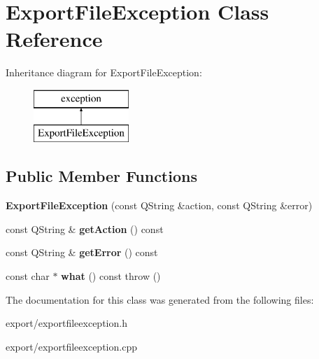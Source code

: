\hypertarget{class_export_file_exception}{\section{Export\-File\-Exception Class Reference}
\label{class_export_file_exception}
}
Inheritance diagram for Export\-File\-Exception\-:\begin{figure}[H]
\begin{center}
\leavevmode
\includegraphics[height=2.000000cm]{class_export_file_exception}
\end{center}
\end{figure}
\subsection*{Public Member Functions}
\begin{DoxyCompactItemize}
\item 
\hypertarget{class_export_file_exception_a700c35c0496ed76883214320fd458d5d}{{\bfseries Export\-File\-Exception} (const Q\-String \&action, const Q\-String \&error)}\label{class_export_file_exception_a700c35c0496ed76883214320fd458d5d}

\item 
\hypertarget{class_export_file_exception_ae1d1a3f3c59d1ceeebb52f6b21319908}{const Q\-String \& {\bfseries get\-Action} () const }\label{class_export_file_exception_ae1d1a3f3c59d1ceeebb52f6b21319908}

\item 
\hypertarget{class_export_file_exception_a538ee96bcc238fcdbbff041c4342fd18}{const Q\-String \& {\bfseries get\-Error} () const }\label{class_export_file_exception_a538ee96bcc238fcdbbff041c4342fd18}

\item 
\hypertarget{class_export_file_exception_a88b7043d1d5d5ec43609c3ee7a6e5714}{const char $\ast$ {\bfseries what} () const   throw ()}\label{class_export_file_exception_a88b7043d1d5d5ec43609c3ee7a6e5714}

\end{DoxyCompactItemize}


The documentation for this class was generated from the following files\-:\begin{DoxyCompactItemize}
\item 
export/exportfileexception.\-h\item 
export/exportfileexception.\-cpp\end{DoxyCompactItemize}
